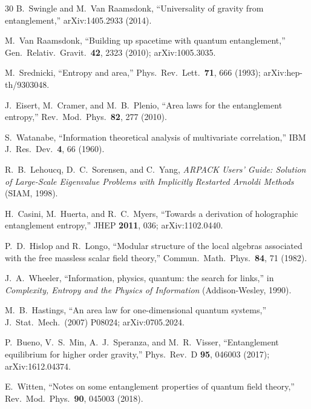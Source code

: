 \documentclass[aps,pra,twocolumn,superscriptaddress,floatfix]{revtex4-2}
\begin{document}
\begin{thebibliography}{30}
B.~Swingle and M.~Van Raamsdonk,
``Universality of gravity from entanglement,''
arXiv:1405.2933 (2014).

M.~Van Raamsdonk,
``Building up spacetime with quantum entanglement,''
Gen.\ Relativ.\ Gravit.\ \textbf{42}, 2323 (2010);
arXiv:1005.3035.

M.~Srednicki,
``Entropy and area,''
Phys.\ Rev.\ Lett.\ \textbf{71}, 666 (1993);
arXiv:hep-th/9303048.

J.~Eisert, M.~Cramer, and M.~B.~Plenio,
``Area laws for the entanglement entropy,''
Rev.\ Mod.\ Phys.\ \textbf{82}, 277 (2010).

S.~Watanabe,
``Information theoretical analysis of multivariate correlation,''
IBM J.\ Res.\ Dev.\ \textbf{4}, 66 (1960).

R.~B.~Lehoucq, D.~C.~Sorensen, and C.~Yang,
\emph{ARPACK Users' Guide: Solution of Large-Scale Eigenvalue Problems with Implicitly Restarted Arnoldi Methods} (SIAM, 1998).

H.~Casini, M.~Huerta, and R.~C.~Myers,
``Towards a derivation of holographic entanglement entropy,''
JHEP \textbf{2011}, 036;
arXiv:1102.0440.

P.~D.~Hislop and R.~Longo,
``Modular structure of the local algebras associated with the free massless scalar field theory,''
Commun.\ Math.\ Phys.\ \textbf{84}, 71 (1982).

J.~A.~Wheeler,
``Information, physics, quantum: the search for links,''
in \emph{Complexity, Entropy and the Physics of Information} (Addison-Wesley, 1990).

M.~B.~Hastings,
``An area law for one-dimensional quantum systems,''
J.\ Stat.\ Mech.\ (2007) P08024;
arXiv:0705.2024.

P.~Bueno, V.~S.~Min, A.~J.~Speranza, and M.~R.~Visser,
``Entanglement equilibrium for higher order gravity,''
Phys.\ Rev.\ D \textbf{95}, 046003 (2017);
arXiv:1612.04374.

E.~Witten,
``Notes on some entanglement properties of quantum field theory,''
Rev.\ Mod.\ Phys.\ \textbf{90}, 045003 (2018).

\end{thebibliography}
\end{document}
